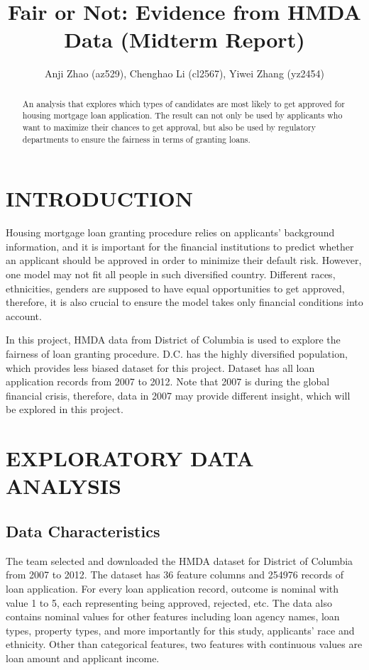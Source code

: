 \documentclass[letterpaper, 10 pt, conference]{ieeeconf}  %
\title{\LARGE \bf
Fair or Not: Evidence from HMDA Data (Midterm Report)
}
\author{Anji Zhao (az529), Chenghao Li (cl2567), Yiwei Zhang (yz2454)}%
\begin{document}
\maketitle
\thispagestyle{empty}
\pagestyle{empty}


\begin{abstract}
An analysis that explores which types of candidates are most likely to get approved for housing mortgage loan application. The result can not only be used by applicants who want to maximize their chances to get approval, but also be used by regulatory departments to ensure the fairness in terms of granting loans. 
\end{abstract}


\section{INTRODUCTION}
Housing mortgage loan granting procedure relies on applicants' background information, and it is important for the financial institutions to predict whether an applicant should be approved in order to minimize their default risk. However, one model may not fit all people in such diversified country. Different races, ethnicities, genders are supposed to have equal opportunities to get approved, therefore, it is also crucial to ensure the model takes only financial conditions into account.

In this project, HMDA data from District of Columbia is used to explore the fairness of loan granting procedure. D.C. has the highly diversified population, which provides less biased dataset for this project. Dataset has all loan application records from 2007 to 2012. Note that 2007 is during the global financial crisis, therefore, data in 2007 may provide different insight, which will be explored in this project.

\section{EXPLORATORY DATA ANALYSIS}
\subsection{Data Characteristics}
The team selected and downloaded the HMDA dataset for District of Columbia from 2007 to 2012. The dataset has 36 feature columns and 254976 records of loan application. For every loan application record, outcome is nominal with value 1 to 5, each representing being approved, rejected, etc. The data also contains nominal values for other features including loan agency names, loan types, property types, and more importantly for this study, applicants' race and ethnicity. Other than categorical features, two features with continuous values are loan amount and applicant income. 
\end{document}
